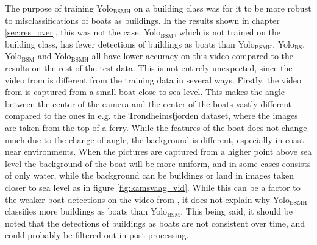 \vspace{3mm}
\noindent
The purpose of training Yolo$_{\text{BSMH}}$ on a building class was for it to be more robust to misclassifications of boats as buildings. In the results shown in chapter \ref{sec:res_over}, this was not the case. Yolo$_{\text{BSM}}$, which is not trained on the building class, has fewer detections of buildings as boats than Yolo$_{\text{BSMH}}$. Yolo$_{\text{BS}}$, Yolo$_{\text{BSM}}$ and Yolo$_{\text{BSMH}}$ all have lower accuracy on this video compared to the results on the rest of the test data. This is not entirely unexpected, since the video from \citep{Kamsvag2018} is different from the training data in several ways. Firstly, the video from \citep{Kamsvag2018} is captured from a small boat close to sea level. This makes the angle between the center of the camera and the center of the boats vastly different compared to the ones in e.g. the Trondheimsfjorden dataset, where the images are taken from the top of a ferry. While the features of the boat does not change much due to the change of angle, the background is different, especially in coast-near environments. When the pictures are captured from a higher point above sea level the background of the boat will be more uniform, and in some cases consists of only water, while the background can be buildings or land in images taken closer to sea level as in figure \ref{fig:kamsvaag_vid}. While this can be a factor to the weaker boat detections on the video from \citep{Kamsvag2018}, it does not explain why Yolo$_{\text{BSMH}}$ classifies more buildings as boats than Yolo$_{\text{BSM}}$. This being said, it should be noted that the detections of buildings as boats are not consistent over time, and could probably be filtered out in post processing.